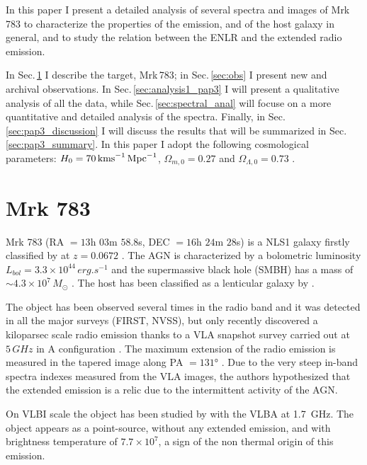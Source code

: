 \documentclass[../main.tex]{subfiles}
\begin{document}
In this paper I present a detailed analysis of several spectra and images of Mrk\,783 to characterize the properties of the emission, and of the host galaxy in general, and to study the relation between the ENLR and the extended radio emission.

In Sec.\,\ref{sec:pap3_mrk783} I describe the target, Mrk\,783; in Sec.\,\ref{sec:obs} I present new and archival observations.
In Sec.\,\ref{sec:analysis1_pap3} I will present a qualitative analysis of all the data, while Sec.\,\ref{sec:spectral_anal} will focuse on a more quantitative and detailed analysis of the spectra.
Finally, in Sec.\,\ref{sec:pap3_discussion} I will discuss the results that will be summarized in Sec.\,\ref{sec:pap3_summary}.
In this paper I adopt the following cosmological parameters: $H_0 = 70\,\si{\kms.Mpc^{-1}}$, $\Omega_{m,0} = 0.27$ and $\Omega_{\Lambda,0} = 0.73$ \citep{Komatsu11}.

\section{Mrk 783}
\label{sec:pap3_mrk783}

Mrk 783 (RA $= 13$h $03$m $58.8$s, DEC $=16$h $24$m $28$s) is a NLS1 galaxy firstly classified by \citet{Osterbrock85} at $z = 0.0672$ \citep{Hewitt91}.
The AGN is characterized by a bolometric luminosity $L_{bol} = 3.3\times 10^{44}\,\si{erg.s^{-1}}$ and the supermassive black hole (SMBH) has a mass of $\sim 4.3\times10^{7}\,\si{M_{\odot}}$ \citep{Berton15a}.
The host has been classified as a lenticular galaxy by \citet{Petrosian07}.

The object has been observed several times in the radio band and it was detected in all the major surveys (FIRST, NVSS), but only recently \citet{Congiu17} discovered a kiloparsec scale radio emission thanks to a VLA snapshot survey carried out at $5\,\si{GHz}$ in A configuration \citep{Berton18}.
The maximum extension of the radio emission is measured in the tapered image along PA $= \ang{131}$ \citep[$14$ kpc][]{Congiu17}.
Due to the very steep in-band spectra indexes measured from the VLA images, the authors hypothesized that the extended emission is a relic due to the intermittent activity of the AGN.

On VLBI scale the object has been studied by \citet{Doi13} with the VLBA at \SI{1.7}{GHz}.
The object appears as a point-source, without any extended emission, and with brightness temperature of $7.7\times10^7$, a sign of the non thermal origin of this emission.
\end{document}
